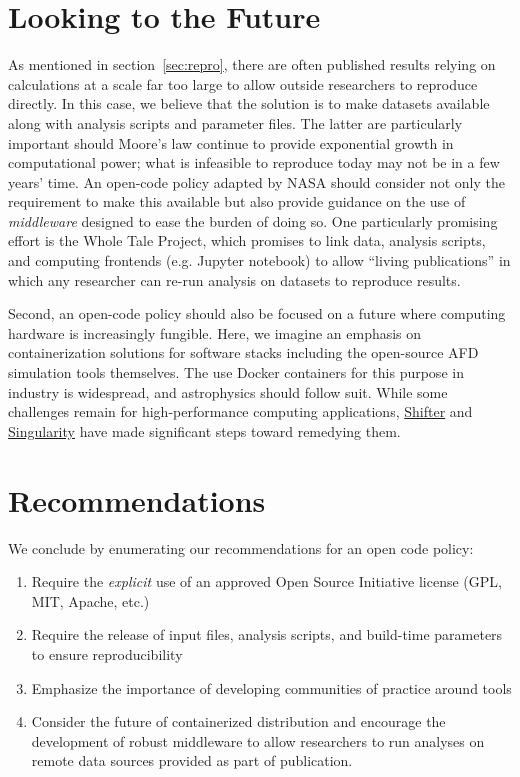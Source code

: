 \documentclass[12pt, titlepage]{aastex62}
\begin{document}
\section{Looking to the Future}
\label{sec:future}

As mentioned in section~\ref{sec:repro}, there are often published results relying on calculations at a scale far too large to allow outside researchers to reproduce directly. In this case, we believe that the solution is to make datasets available along with analysis scripts and parameter files. The latter are particularly important should Moore's law continue to provide exponential growth in computational power; what is infeasible to reproduce today may not be in a few years' time. An open-code policy adapted by NASA should consider not only the requirement to make this available but also provide guidance on the use of \emph{middleware} designed to ease the burden of doing so. One particularly promising effort is the Whole Tale Project, which promises to link data, analysis scripts, and computing frontends (e.g. Jupyter notebook) to allow ``living publications'' in which any researcher can re-run analysis on datasets to reproduce results. 

Second, an open-code policy should also be focused on a future where computing hardware is increasingly fungible. Here, we imagine an emphasis on containerization solutions for software stacks including the open-source AFD simulation tools themselves. The use Docker containers for this purpose in industry is widespread, and astrophysics should follow suit. While some challenges remain for high-performance computing applications, \href{https://github.com/NERSC/shifter}{Shifter} and \href{http://singularity.lbl.gov/}{Singularity} have made significant steps toward remedying them. 

\section{Recommendations}
\label{sec:recommendations}
We conclude by enumerating our recommendations for an open code policy:
\begin{enumerate}
\item Require the \emph{explicit} use of an approved Open Source Initiative license (GPL, MIT, Apache, etc.)
\item Require the release of input files, analysis scripts, and build-time parameters to ensure reproducibility
\item Emphasize the importance of developing communities of practice around tools
\item Consider the future of containerized distribution and encourage the development of robust middleware to allow researchers to run analyses on remote data sources provided as part of publication.
\end{enumerate}

{\footnotesize

}
\end{document}
